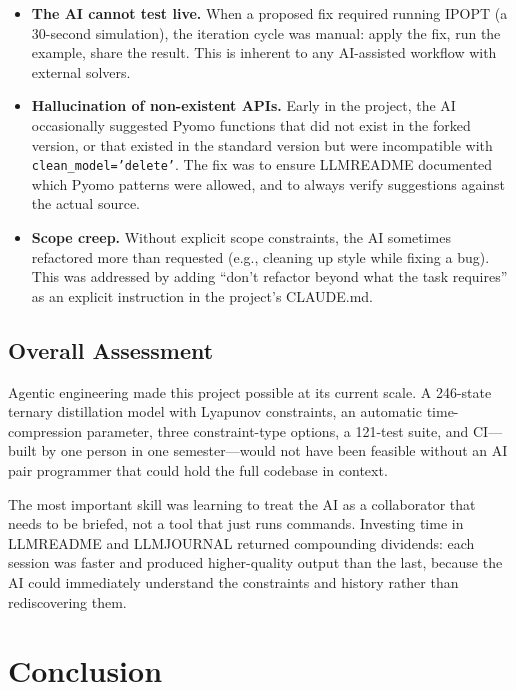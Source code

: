 \documentclass[11pt,letterpaper]{article}
\begin{document}
\begin{itemize}[leftmargin=2em]
  \item \textbf{The AI cannot test live.} When a proposed fix required running IPOPT (a 30-second simulation), the iteration cycle was manual: apply the fix, run the example, share the result. This is inherent to any AI-assisted workflow with external solvers.
  \item \textbf{Hallucination of non-existent APIs.} Early in the project, the AI occasionally suggested Pyomo functions that did not exist in the forked version, or that existed in the standard version but were incompatible with \texttt{clean\_model='delete'}. The fix was to ensure LLMREADME documented which Pyomo patterns were allowed, and to always verify suggestions against the actual source.
  \item \textbf{Scope creep.} Without explicit scope constraints, the AI sometimes refactored more than requested (e.g., cleaning up style while fixing a bug). This was addressed by adding ``don't refactor beyond what the task requires'' as an explicit instruction in the project's CLAUDE.md.
\end{itemize}

\subsection{Overall Assessment}

Agentic engineering made this project possible at its current scale. A 246-state ternary distillation model with Lyapunov constraints, an automatic time-compression parameter, three constraint-type options, a 121-test suite, and CI---built by one person in one semester---would not have been feasible without an AI pair programmer that could hold the full codebase in context.

The most important skill was learning to treat the AI as a collaborator that needs to be briefed, not a tool that just runs commands. Investing time in LLMREADME and LLMJOURNAL returned compounding dividends: each session was faster and produced higher-quality output than the last, because the AI could immediately understand the constraints and history rather than rediscovering them.

\section{Conclusion}
\end{document}
